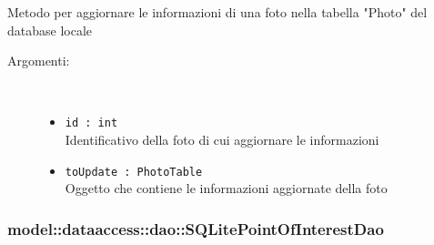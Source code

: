 \documentclass[../DefinizioneDiProdotto.tex]{subfiles}
\begin{document}
\begin{description}
\begin{itemize}
Metodo per aggiornare le informazioni di una foto nella tabella "Photo" del database locale
 \begin{description}
\item[Argomenti:] \
\begin{itemize}
\item \texttt{id : int}\\
Identificativo della foto di cui aggiornare le informazioni\item \texttt{toUpdate : PhotoTable}\\
Oggetto che contiene le informazioni aggiornate della foto\end{itemize}
\end{description}
\end{itemize}
\end{description}

\subsubsection{model::dataaccess::dao::SQLitePointOfInterestDao}
\end{document}
